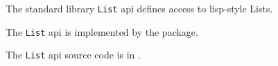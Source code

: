 
The standard library {\tt List} api defines access to lisp-style Lists.

The {\tt List} api is implemented by the  package.

The {\tt List} api source code is in .

